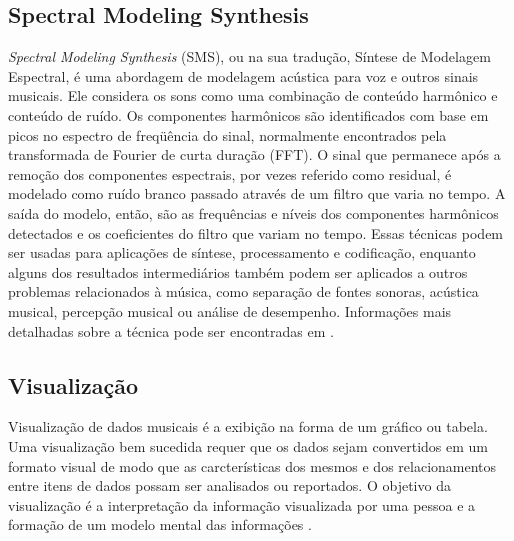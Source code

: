 \subsection{Spectral Modeling Synthesis} \label{subsec:sms}
\textit{Spectral Modeling Synthesis} (SMS), ou na sua tradução, Síntese de Modelagem Espectral, é uma abordagem de modelagem acústica para voz e outros sinais musicais. Ele considera os sons como uma combinação de conteúdo harmônico e conteúdo de ruído. Os componentes harmônicos são identificados com base em picos no espectro de freqüência do sinal, normalmente encontrados pela transformada de Fourier de curta duração (FFT). O sinal que permanece após a remoção dos componentes espectrais, por vezes referido como residual, é modelado como ruído branco passado através de um filtro que varia no tempo. A saída do modelo, então, são as frequências e níveis dos componentes harmônicos detectados e os coeficientes do filtro que variam no tempo. Essas técnicas podem ser usadas para aplicações de síntese, processamento e codificação, enquanto alguns dos resultados intermediários também podem ser aplicados a outros problemas relacionados à música, como separação de fontes sonoras, acústica musical, percepção musical ou análise de desempenho. Informações mais detalhadas sobre a técnica pode ser encontradas em \cite{serra1990}.

\subsection{Visualização} \label{subsec:visualizacao}
Visualização de dados musicais é a exibição na forma de um gráfico ou tabela. Uma visualização bem sucedida requer que os dados sejam convertidos em um formato visual de modo que as carcterísticas dos mesmos e dos relacionamentos entre itens de dados possam ser analisados ou reportados. O objetivo da visualização é a interpretação da informação visualizada por uma pessoa e a formação de um modelo mental das informações \cite{pang2009}.
